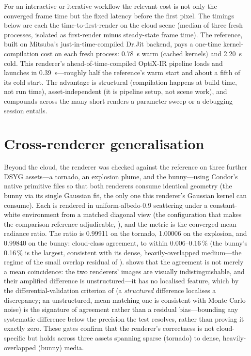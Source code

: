 For an interactive or iterative workflow the relevant cost is not only the converged frame time but the
fixed latency before the first pixel. The timings below are each the time-to-first-render on the cloud scene
(median of three fresh processes, isolated as first-render minus steady-state frame time). The
reference, built on Mitsuba's just-in-time-compiled Dr.Jit
backend, pays a one-time kernel-compilation cost on each fresh process: \SI{0.78}{\second} warm (cached
kernels) and \SI{2.20}{\second} cold. This renderer's ahead-of-time-compiled OptiX-IR pipeline loads
and launches in \SI{0.39}{\second}---roughly half the reference's warm start and about a fifth of its
cold start. The advantage is structural (compilation happens at build time, not run time),
asset-independent (it is pipeline setup, not scene work), and
compounds across the many short renders a parameter sweep or a debugging session entails.

\section{Cross-renderer generalisation}
\label{sec:results-generalisation}

Beyond the cloud, the renderer was checked against the reference on three further DSYG assets---a tornado,
an explosion plume, and the bunny---using Condor's native primitive files so that both renderers consume identical
geometry (the bunny via its single Gaussian fit, the only one this renderer's Gaussian kernel can consume).
Each is rendered in uniform-albedo-\num{0.9} scattering under a constant-white environment from a matched diagonal
view (the configuration that makes the comparison reference-adjudicable, ), and the
metric is the converged-mean radiance ratio.
The ratio is \num{0.99911} on the tornado, \num{1.00006} on the explosion, and \num{0.99840} on the bunny:
cloud-class agreement, to within \num{0.006}--\num{0.16}\,\% (the bunny's \num{0.16}\,\% is the largest,
consistent with its dense, heavily-overlapped medium---the regime of the small overlap residual of
).  shows that the agreement is not merely a
mean coincidence: the two renderers' images are visually indistinguishable, and their amplified
difference is unstructured---it has no localised feature, which by the differential-validation criterion
of  (a \emph{structured} difference localises a discrepancy; an unstructured,
mean-matching one is consistent with Monte Carlo noise) is the signature of agreement rather than a
residual bias---bounding any systematic difference below the precision the test resolves, rather than
proving it exactly zero. These
gates confirm that the renderer's correctness is not cloud-specific but holds across three assets spanning
sparse (tornado) to dense, heavily-overlapped (bunny) media.

